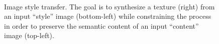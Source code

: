 \begin{figure}[t]
\begin{center}
	\\
	\caption[Image style transfer]{Image style transfer. The goal is to synthesize a texture (right) from an input ``style'' image (bottom-left) while constraining the process in order to preserve the semantic content of an input ``content'' image (top-left).}
	\vspace{-0.65cm}
	\label{fig:style_transfer}
\end{center}
\end{figure}